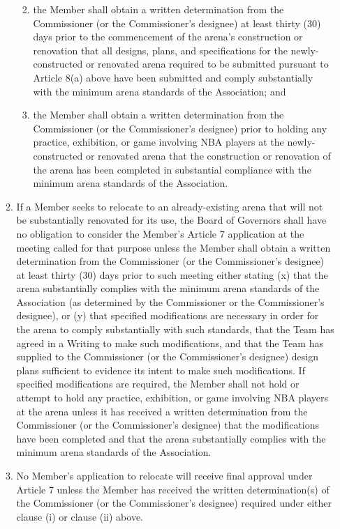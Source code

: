 \documentclass[]{book}
\providecommand{\tightlist}{%
  \setlength{\itemsep}{0pt}\setlength{\parskip}{0pt}}
\begin{document}
\begin{enumerate}
\begin{enumerate}
    \begin{enumerate}
    \def\labelenumiii{(\Alph{enumiii})}
    \tightlist
    \item
      the Member shall obtain a written determination from the Commissioner (or the Commissioner's designee) at least thirty (30) days prior to the commencement of the arena's construction or renovation that all designs, plans, and specifications for the newly-constructed or renovated arena required to be submitted pursuant to Article 8(a) above have been submitted and comply substantially with the minimum arena standards of the Association; and
    \item
      the Member shall obtain a written determination from the Commissioner (or the Commissioner's designee) prior to holding any practice, exhibition, or game involving NBA players at the newly-constructed or renovated arena that the construction or renovation of the arena has been completed in substantial compliance with the minimum arena standards of the Association.
    \end{enumerate}
  \item
    If a Member seeks to relocate to an already-existing arena that will not be substantially renovated for its use, the Board of Governors shall have no obligation to consider the Member's Article 7 application at the meeting called for that purpose unless the Member shall obtain a written determination from the Commissioner (or the Commissioner's designee) at least thirty (30) days prior to such meeting either stating (x) that the arena substantially complies with the minimum arena standards of the Association (as determined by the Commissioner or the Commissioner's designee), or (y) that specified modifications are necessary in order for the arena to comply substantially with such standards, that the Team has agreed in a Writing to make such modifications, and that the Team has supplied to the Commissioner (or the Commissioner's designee) design plans sufficient to evidence its intent to make such modifications. If specified modifications are required, the Member shall not hold or attempt to hold any practice, exhibition, or game involving NBA players at the arena unless it has received a written determination from the Commissioner (or the Commissioner's designee) that the modifications have been completed and that the arena substantially complies with the minimum arena standards of the Association.
  \item
    No Member's application to relocate will receive final approval under Article 7 unless the Member has received the written determination(s) of the Commissioner (or the Commissioner's designee) required under either clause (i) or clause (ii) above.

\end{enumerate}
\end{enumerate}
\end{document}
